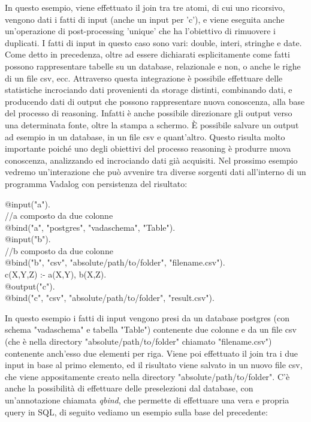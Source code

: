 In questo esempio, viene effettuato il join tra tre atomi, di cui uno ricorsivo, vengono dati i fatti di input (anche un input per 'c'), e viene eseguita anche un'operazione di post-processing 'unique' che ha l'obiettivo di rimuovere i duplicati. \newline
I fatti di input in questo caso sono vari: double, interi, stringhe e date. Come detto in precedenza, oltre ad essere dichiarati esplicitamente come fatti possono rappresentare tabelle su un database, relazionale e non, o anche le righe di un file csv, ecc. \newline
Attraverso questa integrazione è possibile effettuare delle statistiche incrociando dati provenienti da storage distinti, combinando dati, e producendo dati di output che possono rappresentare nuova conoscenza, alla base del processo di reasoning. \newline
Infatti è anche possibile direzionare gli output verso una determinata fonte, oltre la stampa a schermo. È possibile salvare un output ad esempio in un database, in un file csv e quant'altro. Questo risulta molto importante poiché uno degli obiettivi del processo reasoning è produrre nuova conoscenza, analizzando ed incrociando dati già acquisiti. \newline 
Nel prossimo esempio vedremo un'interazione che può avvenire tra diverse sorgenti dati all'interno di un programma Vadalog con persistenza del risultato: 

\begin{algorithm}[h]
	@input("a"). \\
	//a composto da due colonne \\
	@bind("a", "postgres", "vadaschema", "Table"). \\
	@input("b"). \\
	//b composto da due colonne \\
	@bind("b", "csv", "absolute/path/to/folder", "filename.csv"). \\
	c(X,Y,Z) :- a(X,Y), b(X,Z). \\
	@output("c"). \\
	@bind("c", "csv", "absolute/path/to/folder", "result.csv").
\end{algorithm}

In questo esempio i fatti di input vengono presi da un database postgres (con schema "vadaschema" e tabella "Table") contenente due colonne e da un file csv (che è nella directory "absolute/path/to/folder" chiamato "filename.csv") contenente anch'esso due elementi per riga. Viene poi effettuato il join tra i due input in base al primo elemento, ed il risultato viene salvato in un nuovo file csv, che viene appositamente creato nella directory "absolute/path/to/folder". \newline 
C'è anche la possibilità di effettuare delle preselezioni dal database, con un'annotazione chiamata \emph{qbind}, che permette di effettuare una vera e propria query in SQL, di seguito vediamo un esempio sulla base del precedente:

